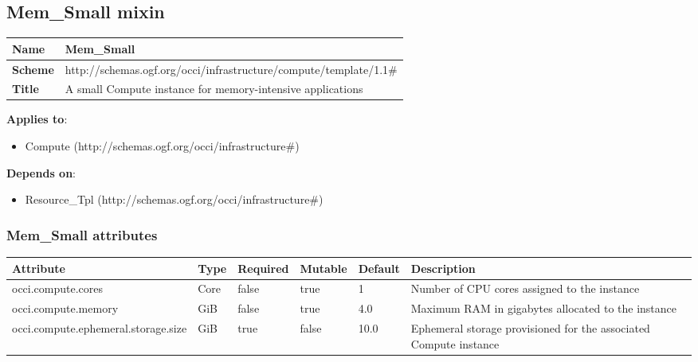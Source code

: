 \documentclass{article}
\begin{document}
\subsection{Mem\_Small mixin}
\begin{center}
\begin{tabular}{|l|l|}
  \hline
  \textbf{Name} & Mem\_Small \\
  \hline  
  \textbf{Scheme} & http://schemas.ogf.org/occi/infrastructure/compute/template/1.1\# \\
  \hline
  \textbf{Title} & A small Compute instance for memory-intensive applications \\
  \hline
\end{tabular}
\end{center}
\textbf{Applies to}:
\begin{itemize}
	\item Compute (http://schemas.ogf.org/occi/infrastructure\#)
\end{itemize}
\textbf{Depends on}:
\begin{itemize}
	\item Resource\_Tpl (http://schemas.ogf.org/occi/infrastructure\#)
\end{itemize}

\subsubsection{Mem\_Small attributes}
\begin{tabularx}{\textwidth}{|l|l|p{1.4cm}|p{1.3cm}|l|X|}
  \hline
  \textbf{Attribute} & \textbf{Type} & \textbf{Required} & \textbf{Mutable} & \textbf{Default} & \textbf{Description} \\
  \hline  
  occi.compute.cores & Core & false & true & 1 & Number of CPU cores assigned to the instance \\
  \hline
  occi.compute.memory & GiB & false & true & 4.0 & Maximum RAM in gigabytes allocated to the instance \\
  \hline
  occi.compute.ephemeral.storage.size & GiB & true & false & 10.0 & Ephemeral storage provisioned for the associated Compute instance \\
  \hline
\end{tabularx}
\end{document}
